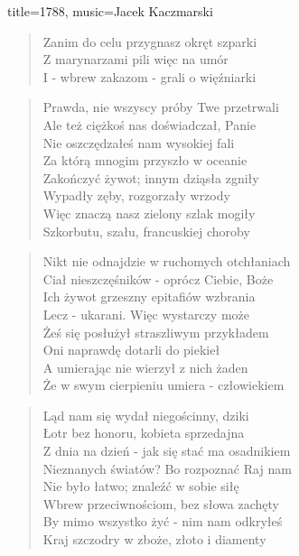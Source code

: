 \begin{song}{title={1788}, music={Jacek Kaczmarski}}
\begin{multicols}{2}
\begin{verse}
Zanim do celu przygnasz okręt szparki \\
Z marynarzami pili więc na umór \\
I - wbrew zakazom - grali o więźniarki \\
\end{verse}
\begin{verse}
Prawda, nie wszyscy próby Twe przetrwali \\
Ale też ciężkoś nas doświadczał, Panie \\
Nie oszczędzałeś nam wysokiej fali \\ 
Za którą mnogim przyszło w oceanie \\
Zakończyć żywot; innym dziąsła zgniły \\
Wypadły zęby, rozgorzały wrzody \\ 
Więc znaczą nasz zielony szlak mogiły \\
Szkorbutu, szału, francuskiej choroby \\
\end{verse}
\begin{verse}
Nikt nie odnajdzie w ruchomych otchłaniach \\
Ciał nieszczęśników - oprócz Ciebie, Boże \\
Ich żywot grzeszny epitafiów wzbrania \\
Lecz - ukarani. Więc wystarczy może \\ 
Żeś się posłużył straszliwym przykładem \\
Oni naprawdę dotarli do piekieł \\
A umierając nie wierzył z nich żaden \\
Że w swym cierpieniu umiera - człowiekiem \\
\end{verse}
\begin{verse}
Ląd nam się wydał niegościnny, dziki \\
Łotr bez honoru, kobieta sprzedajna \\
Z dnia na dzień - jak się stać ma osadnikiem \\
Nieznanych światów? Bo rozpoznać Raj nam \\
Nie było łatwo; znaleźć w sobie siłę \\
Wbrew przeciwnościom, bez słowa zachęty \\
By mimo wszystko żyć - nim nam odkryłeś \\ 
Kraj szczodry w zboże, złoto i diamenty \\
\end{verse}
\begin{verse}

\end{verse}
\end{multicols}
\end{song}

